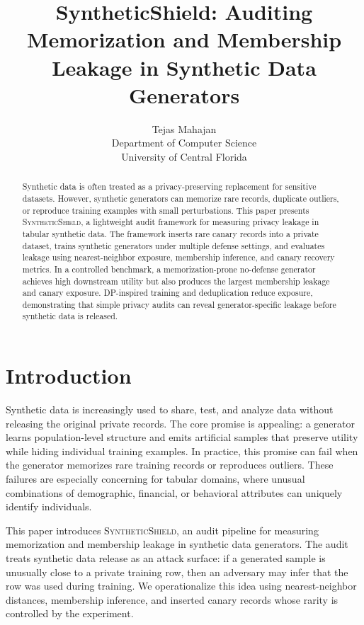 \documentclass[10pt,twocolumn]{article}
\title{SyntheticShield: Auditing Memorization and Membership Leakage in Synthetic Data Generators}
\author{Tejas Mahajan\\Department of Computer Science\\University of Central Florida}
\date{}
\begin{document}
\maketitle

\begin{abstract}
Synthetic data is often treated as a privacy-preserving replacement for sensitive datasets. However, synthetic generators can memorize rare records, duplicate outliers, or reproduce training examples with small perturbations. This paper presents \textsc{SyntheticShield}, a lightweight audit framework for measuring privacy leakage in tabular synthetic data. The framework inserts rare canary records into a private dataset, trains synthetic generators under multiple defense settings, and evaluates leakage using nearest-neighbor exposure, membership inference, and canary recovery metrics. In a controlled benchmark, a memorization-prone no-defense generator achieves high downstream utility but also produces the largest membership leakage and canary exposure. DP-inspired training and deduplication reduce exposure, demonstrating that simple privacy audits can reveal generator-specific leakage before synthetic data is released.
\end{abstract}

\section{Introduction}
Synthetic data is increasingly used to share, test, and analyze data without releasing the original private records. The core promise is appealing: a generator learns population-level structure and emits artificial samples that preserve utility while hiding individual training examples. In practice, this promise can fail when the generator memorizes rare training records or reproduces outliers. These failures are especially concerning for tabular domains, where unusual combinations of demographic, financial, or behavioral attributes can uniquely identify individuals.

This paper introduces \textsc{SyntheticShield}, an audit pipeline for measuring memorization and membership leakage in synthetic data generators. The audit treats synthetic data release as an attack surface: if a generated sample is unusually close to a private training row, then an adversary may infer that the row was used during training. We operationalize this idea using nearest-neighbor distances, membership inference, and inserted canary records whose rarity is controlled by the experiment.
\end{document}
